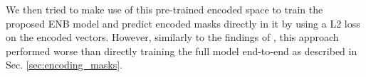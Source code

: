 We then tried to make use of this pre-trained encoded space to train the proposed ENB model and predict encoded masks directly in it by using a L2 loss on the encoded vectors. However, similarly to the findings of \cite{hirsch2020patchperpix}, this approach performed worse than directly training the full model end-to-end as described in Sec. \ref{sec:encoding_masks}. \\



